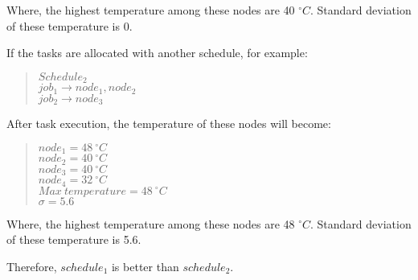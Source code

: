 Where, the highest temperature among these nodes are 40 $^\circ C$. Standard deviation of these temperature is 0.
 
If the tasks are allocated with another schedule, for example: 
  
\begin{quote}
$Schedule_2$
 \\
$job_1\to node_1, node_2$ \\
$job_2 \to node_3$ \\
\end{quote}

After task execution, the temperature of these nodes will become:

\begin{quote}
$node_1=48~^\circ C$ \\
$node_2=40~^\circ C$ \\
$node_3=40~^\circ C$ \\ 
$node_4=32~^\circ C$ \\
$Max~temperature=48~^\circ C$ \\
$\sigma =5.6$ \\
\end{quote}
Where, the highest temperature among these nodes are 48 $^\circ C$. Standard deviation of these temperature is 5.6.

Therefore, $schedule_1$ is better than $schedule_2$.



